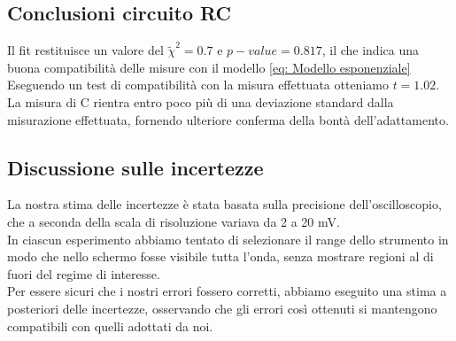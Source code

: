 \documentclass[letterpaper,12pt]{article}
\begin{document}
\subsection{Conclusioni circuito RC}
Il fit restituisce un valore del $\widetilde{\chi}^2 = 0.7$ e $p-value = 0.817$, il che indica una buona compatibilità delle misure con il modello \eqref{eq: Modello esponenziale}\\

Eseguendo un test di compatibilità con la misura effettuata otteniamo $t = 1.02$. \\

La misura di C rientra entro poco più di una deviazione standard dalla misurazione effettuata, fornendo ulteriore conferma della bontà dell'adattamento.

\subsection{Discussione sulle incertezze}
La nostra stima delle incertezze è stata basata sulla precisione dell'oscilloscopio, che a seconda della scala di risoluzione variava da 2 a 20 mV. \\
In ciascun esperimento abbiamo tentato di selezionare il range dello strumento in modo che nello schermo fosse visibile tutta l'onda, senza mostrare regioni al di fuori del regime di interesse.\\
Per essere sicuri che i nostri errori fossero corretti, abbiamo eseguito una stima a posteriori delle incertezze, osservando che gli errori così ottenuti si mantengono compatibili con quelli adottati da noi.
\end{document}
